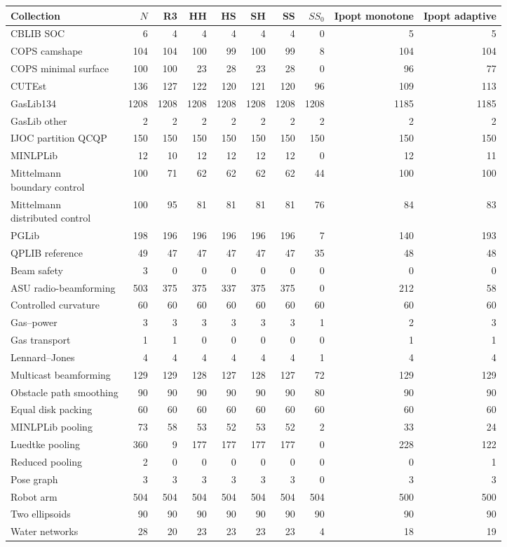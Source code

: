 \begin{tabular}{@{}lrrrrrrrrr@{}}
\toprule
Collection & $N$ & R3 & HH & HS & SH & SS & $SS_0$ & Ipopt monotone & Ipopt adaptive\\
\midrule
CBLIB SOC & 6 & 4 & 4 & 4 & 4 & 4 & 0 & 5 & 5\\
COPS camshape & 104 & 104 & 100 & 99 & 100 & 99 & 8 & 104 & 104\\
COPS minimal surface & 100 & 100 & 23 & 28 & 23 & 28 & 0 & 96 & 77\\
CUTEst & 136 & 127 & 122 & 120 & 121 & 120 & 96 & 109 & 113\\
GasLib134 & 1208 & 1208 & 1208 & 1208 & 1208 & 1208 & 1208 & 1185 & 1185\\
GasLib other & 2 & 2 & 2 & 2 & 2 & 2 & 2 & 2 & 2\\
IJOC partition QCQP & 150 & 150 & 150 & 150 & 150 & 150 & 150 & 150 & 150\\
MINLPLib & 12 & 10 & 12 & 12 & 12 & 12 & 0 & 12 & 11\\
\shortstack[l]{Mittelmann\\boundary control} & 100 & 71 & 62 & 62 & 62 & 62 & 44 & 100 & 100\\
\shortstack[l]{Mittelmann\\distributed control} & 100 & 95 & 81 & 81 & 81 & 81 & 76 & 84 & 83\\
PGLib & 198 & 196 & 196 & 196 & 196 & 196 & 7 & 140 & 193\\
QPLIB reference & 49 & 47 & 47 & 47 & 47 & 47 & 35 & 48 & 48\\
Beam safety & 3 & 0 & 0 & 0 & 0 & 0 & 0 & 0 & 0\\
ASU radio-beamforming & 503 & 375 & 375 & 337 & 375 & 375 & 0 & 212 & 58\\
Controlled curvature & 60 & 60 & 60 & 60 & 60 & 60 & 60 & 60 & 60\\
Gas--power & 3 & 3 & 3 & 3 & 3 & 3 & 1 & 2 & 3\\
Gas transport & 1 & 1 & 0 & 0 & 0 & 0 & 0 & 1 & 1\\
Lennard--Jones & 4 & 4 & 4 & 4 & 4 & 4 & 1 & 4 & 4\\
Multicast beamforming & 129 & 129 & 128 & 127 & 128 & 127 & 72 & 129 & 129\\
Obstacle path smoothing & 90 & 90 & 90 & 90 & 90 & 90 & 80 & 90 & 90\\
Equal disk packing & 60 & 60 & 60 & 60 & 60 & 60 & 60 & 60 & 60\\
MINLPLib pooling & 73 & 58 & 53 & 52 & 53 & 52 & 2 & 33 & 24\\
Luedtke pooling & 360 & 9 & 177 & 177 & 177 & 177 & 0 & 228 & 122\\
Reduced pooling & 2 & 0 & 0 & 0 & 0 & 0 & 0 & 0 & 1\\
Pose graph & 3 & 3 & 3 & 3 & 3 & 3 & 0 & 3 & 3\\
Robot arm & 504 & 504 & 504 & 504 & 504 & 504 & 504 & 500 & 500\\
Two ellipsoids & 90 & 90 & 90 & 90 & 90 & 90 & 90 & 90 & 90\\
Water networks & 28 & 20 & 23 & 23 & 23 & 23 & 4 & 18 & 19\\
\bottomrule
\end{tabular}
